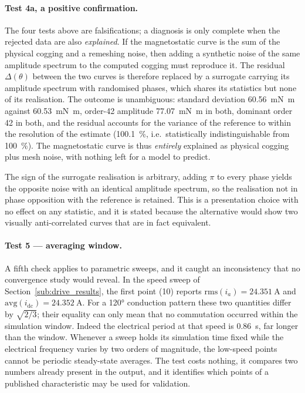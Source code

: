 \documentclass[10pt,a4paper,twocolumn]{article}
\theoremstyle{plain}
\theoremstyle{remark}
\begin{document}
\paragraph{Test 4a, a positive confirmation.}
The four tests above are falsifications; a diagnosis is only complete
when the rejected data are also \emph{explained}. If the magnetostatic
curve is the sum of the physical cogging and a remeshing noise, then
adding a synthetic noise of the same amplitude spectrum to the computed
cogging must reproduce it. The residual $\Delta(\theta)$ between the two
curves is therefore replaced by a surrogate carrying its amplitude
spectrum with randomised phases, which shares its statistics but none of
its realisation. The outcome is unambiguous: standard deviation
\SI{60.56}{\milli\newton\metre} against \SI{60.53}{\milli\newton\metre},
order-42 amplitude \SI{77.07}{\milli\newton\metre} in both, dominant
order 42 in both, and the residual accounts for the variance of the
reference to within the resolution of the estimate
(\SI{100.1}{\percent}, i.e.\ statistically indistinguishable from
\SI{100}{\percent}). The magnetostatic curve is thus \emph{entirely}
explained as physical cogging plus mesh noise, with nothing left for a
model to predict.

The sign of the surrogate realisation is arbitrary, adding $\pi$ to
every phase yields the opposite noise with an identical amplitude
spectrum, so the realisation not in phase opposition with the reference
is retained. This is a presentation choice with no effect on any
statistic, and it is stated because the alternative would show two
visually anti-correlated curves that are in fact equivalent.

\paragraph{Test 5 --- averaging window.}
A fifth check applies to parametric sweeps, and it caught an
inconsistency that no convergence study would reveal. In the speed sweep
of Section~\ref{sub:drive_results}, the first point (\SI{10}{\rpm})
reports $\mathrm{rms}(i_a)=\SI{24.351}{\ampere}$ and
$\mathrm{avg}(i_{\mathrm{dc}})=\SI{24.352}{\ampere}$. For a \ang{120}
conduction pattern these two quantities differ by $\sqrt{2/3}$; their
equality can only mean that no commutation occurred within the
simulation window. Indeed the electrical period at that speed is
\SI{0.86}{\second}, far longer than the window. Whenever a sweep holds
its simulation time fixed while the electrical frequency varies by two
orders of magnitude, the low-speed points cannot be periodic
steady-state averages. The test costs nothing, it compares two numbers
already present in the output, and it identifies which points of a
published characteristic may be used for validation.
\end{document}
